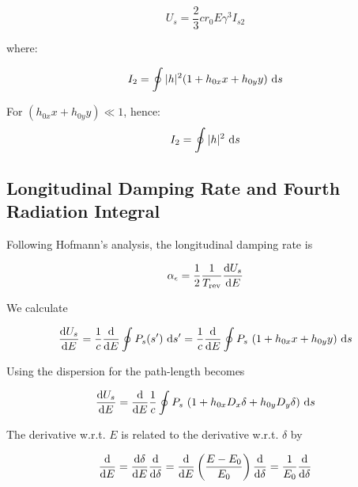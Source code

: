 \begin{equation}
\label{eq:enelossturn}
U_s =\frac{2}{3} c r_0 E \gamma^3 I_{s2}
\end{equation}

where:

\begin{equation}
I_2     = \oint |h|^2 (1 + h_{0x}x + h_{0y}y) \ \text{d} s\\
\end{equation}

For $(h_{0x}x + h_{0y}y) \ll 1$, hence:
\begin{equation}
I_2     = \oint |h|^2 \ \text{d} s\\
\end{equation}

\subsection{Longitudinal Damping Rate and Fourth Radiation Integral}
\label{sec:longdampandi4}

Following Hofmann's analysis, the longitudinal damping rate is\cite{hofmann2009}

\begin{equation}
    \alpha_\epsilon = \frac{1}{2} \frac{1}{T_\text{rev}} \frac{\text{d} {U_s}}{\text{d} {E}}
\end{equation}

We calculate

\begin{equation}
    \frac{\text{d} {U_s}}{\text{d} {E}} = \frac{1}{c} \frac{\text{d} {}}{\text{d} {E}} \oint P_s(s') \ \text{d} s' = \frac{1}{c} \frac{\text{d} {}}{\text{d} {E}} \oint P_s \ (1 + h_{0x}x + h_{0y}y)\ \text{d} s
    \label{eq:dUdEoint}
\end{equation}

Using the dispersion for the path-length becomes

\begin{equation}
    \frac{\text{d} {U_s}}{\text{d} {E}} = \frac{\text{d} {}}{\text{d} {E}} \frac{1}{c} \oint P_s \ (1 + h_{0x}D_x \delta + h_{0y} D_y \delta)\ \text{d} s
\end{equation}

The derivative w.r.t. $E$ is related to the derivative w.r.t. $\delta$ by

\begin{equation}
    \frac{\text{d} {}}{\text{d} {E}} = \frac{\text{d} {\delta}}{\text{d} {E}} \frac{\text{d} {}}{\text{d} {\delta}} = \frac{\text{d} {}}{\text{d} {E}} \left( \frac{E - E_0}{E_0} \right) \frac{\text{d} {}}{\text{d} {\delta}} = \frac{1}{E_0} \frac{\text{d} {}}{\text{d} {\delta}}
    \label{eq:ddEtodddelta}
\end{equation}

